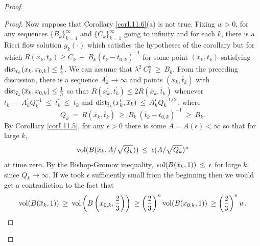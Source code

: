 \begin{proof}
\begin{proof}
Now suppose that Corollary \ref{corI.11.6}(a) is not true.
Fixing $w > 0$,
for any sequences $\{B_k\}_{k=1}^\infty$ and $\{C_k\}_{k=1}^\infty$
going to infinity and
for each $k$, there is a Ricci flow solution $g_k(\cdot)$
which satisfies the hypotheses of
the corollary but for which $R(x_k,t_k) \ge C_k \: + \: B_k (t_k - t_{0,k})^{-1}$
for some point $(x_k, t_k)$ satisfying $\operatorname{dist}_{t_k}(x_k, x_{0,k}) \le \frac14$.
We can assume that $\lambda^2 \: C_k^{\frac12} \: \ge \: B_k$.
From the preceding discussion, there is a sequence $A^\prime_k \rightarrow
\infty$ and points $(\overline{x}_k, \overline{t}_k)$
with $\operatorname{dist}_{\overline{t}_k}(\overline{x}_k, {x}_{0,k}) \le \frac13$ so that
$R(x_k^\prime, t_k^\prime) \le 2
R(\overline{x}_k, \overline{t}_k)$ whenever
$\overline{t}_k \: - \: A_k^\prime
Q_k^{-1} \: \le \: t_k^\prime \: \le \: \overline{t}_k$ and
$\operatorname{dist}_{\overline{t}_k}(x_k^\prime, \overline{x}_k) \: \le \: A_k^\prime
Q_k^{-1/2}$, where
\begin{equation}
Q_k \: = \: R(\overline{x}_k, \overline{t}_k) \: \ge \:
B_k \: (\overline{t}_k - t_{0,k})^{-1} \: \ge \: B_k.
\end{equation}
By Corollary \ref{corI.11.5}, for any $\epsilon > 0$ there is some
$A = A(\epsilon)< \infty$
so that for large $k$,
\begin{equation}
\operatorname{vol}(B(\overline{x}_k, A/\sqrt{Q_k})) \: \le \: \epsilon
(A/\sqrt{Q_k})^n
\end{equation}
at time zero. By the Bishop-Gromov inequality,
$\operatorname{vol}(B(\overline{x}_k, 1)) \: \le \: \epsilon$ for large $k$, since
$Q_k \rightarrow \infty$.
If we took $\epsilon$ sufficiently small from the beginning then we
would get a contradiction to the fact that
\begin{equation}
\operatorname{vol}(B(\overline{x}_k, 1)) \: \ge \: \operatorname{vol} \left( B \left( x_{0,k}, \frac23 \right) \right) \: \ge
\left( \frac23 \right)^n \operatorname{vol}(B(x_{0,k}, 1)) \: \ge \left( \frac23 \right)^n w.
\end{equation}



\end{proof}
\end{proof}
